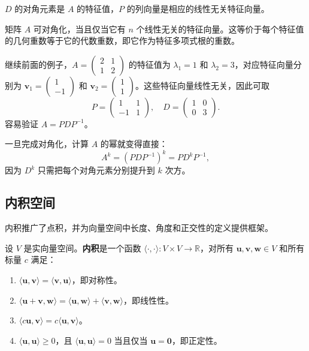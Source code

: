$D$ 的对角元素是 $A$ 的特征值，$P$ 的列向量是相应的线性无关特征向量。

\begin{theorem}
矩阵 $A$ 可对角化，当且仅当它有 $n$ 个线性无关的特征向量。这等价于每个特征值的几何重数等于它的代数重数，即它作为特征多项式根的重数。
\end{theorem}

\begin{example}
继续前面的例子，$A=\begin{pmatrix}2&1\\1&2\end{pmatrix}$ 的特征值为 $\lambda_1=1$ 和 $\lambda_2=3$，对应特征向量分别为 $\mathbf{v}_1=\begin{pmatrix}1\\-1\end{pmatrix}$ 和 $\mathbf{v}_2=\begin{pmatrix}1\\1\end{pmatrix}$。这些特征向量线性无关，因此可取
\[
P=\begin{pmatrix}1&1\\-1&1\end{pmatrix},\quad D=\begin{pmatrix}1&0\\0&3\end{pmatrix}.
\]
容易验证 $A=PDP^{-1}$。
\end{example}

一旦完成对角化，计算 $A$ 的幂就变得直接：
\[
A^k=(PDP^{-1})^k=PD^kP^{-1},
\]
因为 $D^k$ 只需把每个对角元素分别提升到 $k$ 次方。

\subsection{内积空间}

内积推广了点积，并为向量空间中长度、角度和正交性的定义提供框架。

\begin{definition}[内积]
设 $V$ 是实向量空间。\textbf{内积}是一个函数 $\langle\cdot,\cdot\rangle:V\times V\to\mathbb{R}$，对所有 $\mathbf{u},\mathbf{v},\mathbf{w}\in V$ 和所有标量 $c$ 满足：
\begin{enumerate}
    \item $\langle\mathbf{u},\mathbf{v}\rangle=\langle\mathbf{v},\mathbf{u}\rangle$，即对称性。
    \item $\langle\mathbf{u}+\mathbf{v},\mathbf{w}\rangle=\langle\mathbf{u},\mathbf{w}\rangle+\langle\mathbf{v},\mathbf{w}\rangle$，即线性性。
    \item $\langle c\mathbf{u},\mathbf{v}\rangle=c\langle\mathbf{u},\mathbf{v}\rangle$。
    \item $\langle\mathbf{u},\mathbf{u}\rangle\geq0$，且 $\langle\mathbf{u},\mathbf{u}\rangle=0$ 当且仅当 $\mathbf{u}=\mathbf{0}$，即正定性。
\end{enumerate}
\end{definition}

